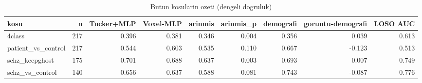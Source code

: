 \begin{table}[htbp]
  \centering
  \caption{Butun kosularin ozeti (dengeli dogruluk)}
  \label{tab:master}
  \small
  \begin{tabular}{lrrrrrrrr}
    \toprule
    kosu & n & Tucker+MLP & Voxel-MLP & arinmis & arinmis\_p & demografi & goruntu-demografi & LOSO AUC \\
    \midrule
    4class & 217 & 0.396 & 0.381 & 0.346 & 0.004 & 0.356 & 0.039 & 0.613 \\
    patient\_vs\_control & 217 & 0.544 & 0.603 & 0.535 & 0.110 & 0.667 & -0.123 & 0.513 \\
    schz\_keepghost & 175 & 0.701 & 0.688 & 0.637 & 0.003 & 0.693 & 0.007 & 0.749 \\
    schz\_vs\_control & 140 & 0.656 & 0.637 & 0.588 & 0.081 & 0.743 & -0.087 & 0.776 \\
    \bottomrule
  \end{tabular}
\end{table}
